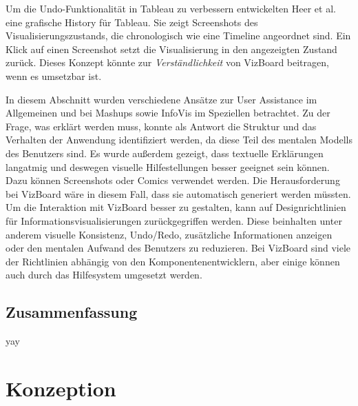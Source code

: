 \documentclass[
	headsepline,
	footsepline,
	fontsize=12pt,
	bibliography=totoc
]{scrbook}
\begin{document}

Um die Undo-Funktionalität in Tableau zu verbessern entwickelten Heer et al. \cite{Heer2008} eine grafische History für Tableau. Sie zeigt Screenshots des Visualisierungszustands, die chronologisch wie eine Timeline angeordnet sind. Ein Klick auf einen Screenshot setzt die Visualisierung in den angezeigten Zustand zurück. Dieses Konzept könnte zur \emph{Verständlichkeit} von VizBoard beitragen, wenn es umsetzbar ist.



In diesem Abschnitt wurden verschiedene Ansätze zur User Assistance im Allgemeinen und bei Mashups sowie InfoVis im Speziellen betrachtet. Zu der Frage, was erklärt werden muss, konnte als Antwort die Struktur und das Verhalten der Anwendung identifiziert werden, da diese Teil des mentalen Modells des Benutzers sind. Es wurde außerdem gezeigt, dass textuelle Erklärungen langatmig und deswegen visuelle Hilfestellungen besser geeignet sein können. Dazu können Screenshots oder Comics verwendet werden. Die Herausforderung bei VizBoard wäre in diesem Fall, dass sie automatisch generiert werden müssten. Um die Interaktion mit VizBoard besser zu gestalten, kann auf Designrichtlinien für Informationsvisualisierungen zurückgegriffen werden. Diese beinhalten unter anderem visuelle Konsistenz, Undo/Redo, zusätzliche Informationen anzeigen oder den mentalen Aufwand des Benutzers zu reduzieren. Bei VizBoard sind viele der Richtlinien abhängig von den Komponentenentwicklern, aber einige können auch durch das Hilfesystem umgesetzt werden.

\section{Zusammenfassung}
\label{section:standderforschung:zusammenfassung}

yay

\chapter{Konzeption}
\label{chapter:konzeption}
\end{document}
